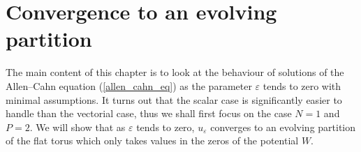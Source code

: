 \chapter{Convergence to an evolving partition}
\label{chapter_convergence_to_evolving_partition}

The main content of this chapter is to look at the behaviour of solutions of 
the Allen--Cahn equation (\ref{allen_cahn_eq}) as the parameter $ \varepsilon $ 
tends to zero with minimal assumptions.
It turns out that the scalar case is 
significantly easier to handle than the vectorial case, thus we shall first 
focus on the case $ N = 1 $ and $ P = 2 $. 
We will show that as $ 
\varepsilon $ 
tends to zero, $ u_{ \varepsilon } $ converges to an evolving partition of the 
flat torus which only takes values in the zeros of the potential $ W $. 






